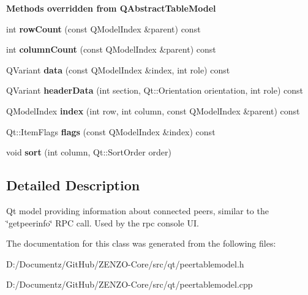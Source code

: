 \begin{Indent}\textbf{ Methods overridden from Q\+Abstract\+Table\+Model}\par
\begin{DoxyCompactItemize}
\item 
\mbox{\label{class_peer_table_model_a893cd78a1bfc89c71a1746d3c3e70e95}} 
int {\bfseries row\+Count} (const Q\+Model\+Index \&parent) const
\item 
\mbox{\label{class_peer_table_model_aec5793e7f02694bd35b05ea1200c4b46}} 
int {\bfseries column\+Count} (const Q\+Model\+Index \&parent) const
\item 
\mbox{\label{class_peer_table_model_a7229a1e75b1ecab25add4098b6bb9d27}} 
Q\+Variant {\bfseries data} (const Q\+Model\+Index \&index, int role) const
\item 
\mbox{\label{class_peer_table_model_ab2db3038337ab51cf8655a4d9f0546d2}} 
Q\+Variant {\bfseries header\+Data} (int section, Qt\+::\+Orientation orientation, int role) const
\item 
\mbox{\label{class_peer_table_model_a11faadd62beac5b9dec146045e8ecbbb}} 
Q\+Model\+Index {\bfseries index} (int row, int column, const Q\+Model\+Index \&parent) const
\item 
\mbox{\label{class_peer_table_model_ad0e101ec541cde4a163d490b58c5442a}} 
Qt\+::\+Item\+Flags {\bfseries flags} (const Q\+Model\+Index \&index) const
\item 
\mbox{\label{class_peer_table_model_ac2211cda0ce659ac4c324c6ff24e1e5f}} 
void {\bfseries sort} (int column, Qt\+::\+Sort\+Order order)
\end{DoxyCompactItemize}
\end{Indent}


\subsection{Detailed Description}
Qt model providing information about connected peers, similar to the \char`\"{}getpeerinfo\char`\"{} R\+PC call. Used by the rpc console UI. 

The documentation for this class was generated from the following files\+:\begin{DoxyCompactItemize}
\item 
D\+:/\+Documentz/\+Git\+Hub/\+Z\+E\+N\+Z\+O-\/\+Core/src/qt/peertablemodel.\+h\item 
D\+:/\+Documentz/\+Git\+Hub/\+Z\+E\+N\+Z\+O-\/\+Core/src/qt/peertablemodel.\+cpp\end{DoxyCompactItemize}
